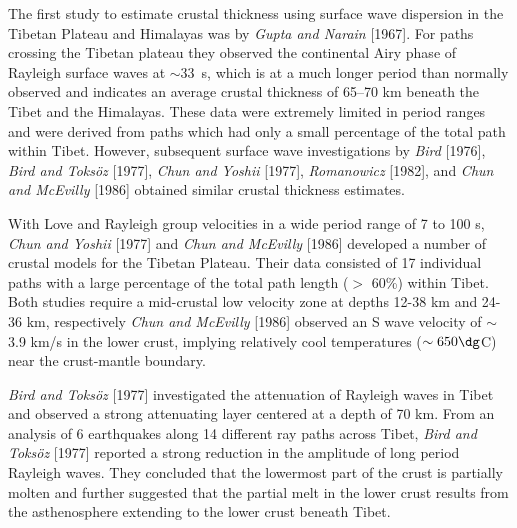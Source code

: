 \documentclass[12pt]{article}
\begin{document}
The first study to estimate crustal thickness using surface wave dispersion in the Tibetan Plateau and 
Himalayas was by {\it Gupta and Narain} [1967].  For paths crossing the Tibetan
plateau they observed the continental Airy phase of Rayleigh surface
waves at $\sim$33~s, which is at a much longer period than normally
observed and indicates an average crustal thickness of 65--70 km beneath
the Tibet and the Himalayas.  These data were extremely limited in period ranges and were derived from 
paths which had only a small percentage of the total path within Tibet. However, subsequent surface wave 
investigations by {\it Bird} [1976], {\it Bird and Toks\"oz} [1977], {\it Chun and Yoshii} [1977], {\it 
Romanowicz} [1982], and {\it Chun and McEvilly} [1986] obtained similar crustal thickness estimates. 

With Love and Rayleigh group velocities in a wide period range of 7 to 100 s, {\it Chun and Yoshii} [1977] and {\it Chun and McEvilly} [1986] 
developed a number of crustal models for the Tibetan Plateau.  Their data  consisted of 17 individual paths with a large percentage 
of the total path length ($>$ 60\%) within Tibet. Both studies require a
mid-crustal low velocity zone at depths 12-38 km and 24-36 km, respectively 
{\it Chun and McEvilly} [1986] observed an S wave velocity of $\sim$ 3.9 km/s in the lower crust, implying
relatively cool temperatures ($\sim 650 \dg$C) near the crust-mantle boundary. 

{\it Bird and Toks\"oz} [1977] investigated the attenuation of Rayleigh waves in Tibet and observed a 
strong attenuating layer centered at a depth of 70 km.  From an analysis of
  6 earthquakes along 14 
different ray paths across Tibet, {\it Bird and Toks\"oz} [1977] reported a strong reduction in the 
amplitude of long period Rayleigh waves.  They concluded that the 
lowermost part of the crust is partially molten and further suggested that the partial melt in the lower crust 
results from the asthenosphere extending to the lower crust beneath Tibet.  
\end{document}
